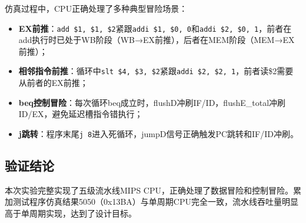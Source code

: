 仿真过程中，CPU正确处理了多种典型冒险场景：

\begin{itemize}
    \item \textbf{EX前推}：\texttt{add \$1, \$1, \$2}紧跟\texttt{addi \$1, \$0, 0}和\texttt{addi \$2, \$0, 1}，前者在add执行时已处于WB阶段（WB→EX前推），后者在MEM阶段（MEM→EX前推）；
    \item \textbf{相邻指令前推}：循环中\texttt{slt \$4, \$3, \$2}紧跟\texttt{addi \$2, \$2, 1}，前者读\$2需要从前者的EX前推；
    \item \textbf{beq控制冒险}：每次循环beq成立时，flushD冲刷IF/ID，flushE\_total冲刷ID/EX，避免延迟槽指令错执行；
    \item \textbf{j跳转}：程序末尾\texttt{j 8}进入死循环，jumpD信号正确触发PC跳转和IF/ID冲刷。
\end{itemize}

\subsection{验证结论}

本次实验完整实现了五级流水线MIPS CPU，正确处理了数据冒险和控制冒险。累加测试程序仿真结果5050（0x13BA）与单周期CPU完全一致，流水线吞吐量明显高于单周期实现，达到了设计目标。
